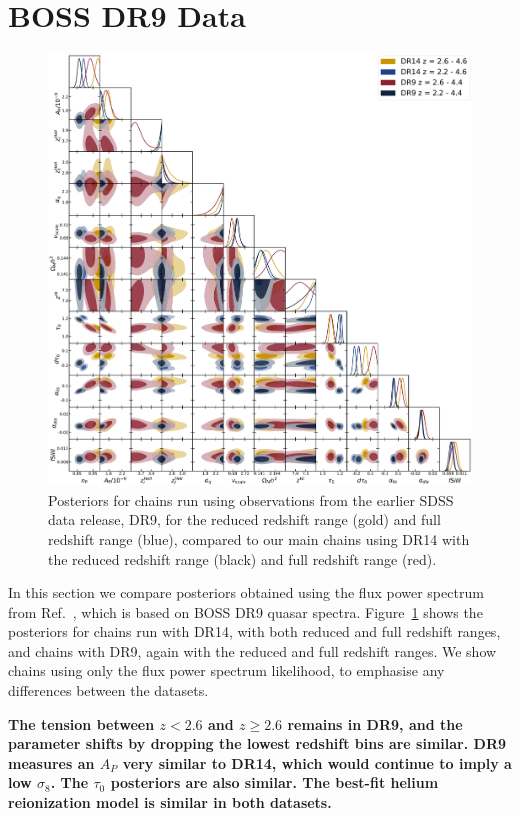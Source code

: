 \section{BOSS DR9 Data}\label{sec:dr9_results}
\begin{figure}
    \centering
    \includegraphics[width=\textwidth]{figures/dr9_allp_corner.pdf}
    \caption{\label{fig:dr9_corner}
    Posteriors for chains run using observations from the earlier SDSS data release, DR9, for the reduced redshift range (gold) and full redshift range (blue), compared to our main chains using DR14 with the reduced redshift range (black) and full redshift range (red).
    }
\end{figure}

In this section we compare posteriors obtained using the flux power spectrum from Ref.~\cite{2013A&A...559A..85P}, which is based on BOSS DR9 quasar spectra.
Figure~\ref{fig:dr9_corner} shows the posteriors for chains run with DR14, with both reduced and full redshift ranges, and chains with DR9, again with the reduced and full redshift ranges. We show chains using only the flux power spectrum likelihood, to emphasise any differences between the datasets.

\textbf{The tension between $z <2.6$ and $z \geq 2.6$ remains in DR9, and the parameter shifts by dropping the lowest redshift bins are similar. DR9 measures an $A_P$ very similar to DR14, which would continue to imply a low $\sigma_8$. 
The $\tau_0$ posteriors are also similar. The best-fit helium reionization model is similar in both datasets.}

